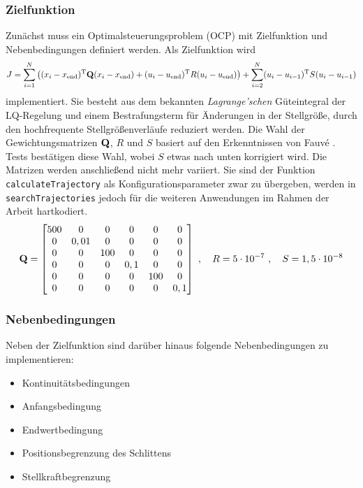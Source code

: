 \subsubsection{Zielfunktion}

Zunächst muss ein Optimalsteuerungsproblem (OCP) mit Zielfunktion und Nebenbedingungen definiert werden. Als Zielfunktion wird 
	\[
	J = \sum_{i=1}^N \left((x_i-x_{\mathrm{end}})^{\mathrm{T}} {\boldsymbol{\mathrm{Q}}} (x_i-x_{\mathrm{end}}) + (u_i-u_{\mathrm{end}})^{\mathrm{T}} R (u_i-u_{\mathrm{end}})\right) + 
	\sum_{i=2}^N (u_i-u_{i-1})^{\mathrm{T}} S (u_i-u_{i-1})
\]
implementiert. Sie besteht aus dem bekannten \emph{Lagrange'schen} Güteintegral der LQ-Regelung und einem Bestrafungsterm für Änderungen in der Stellgröße, durch den hochfrequente Stellgrößenverläufe reduziert werden. Die Wahl der Gewichtungsmatrizen ${\boldsymbol{\mathrm{Q}}}$, $R$ und $S$ basiert auf den Erkenntnissen von Fauvé \cite{fauve}. Tests bestätigen diese Wahl, wobei $S$ etwas nach unten korrigiert wird. Die Matrizen werden anschließend nicht mehr variiert. Sie sind der Funktion \texttt{calculateTrajectory} als Konfigurationsparameter zwar zu übergeben, werden in \texttt{searchTrajectories} jedoch für die weiteren Anwendungen im Rahmen der Arbeit hartkodiert.
\[ 
	{\boldsymbol{\mathrm{Q}}} = 
	\begin{bmatrix}
		500 & 0 & 0 & 0 & 0 & 0 \\
		0 & 0,01 & 0 & 0 & 0 & 0 \\
		0 & 0 & 100 & 0 & 0 & 0 \\
		0 & 0 & 0 & 0,1 & 0 & 0 \\
		0 & 0 & 0 & 0 & 100 & 0 \\
		0 & 0 & 0 & 0 & 0 & 0,1 \\
	\end{bmatrix} \ , \quad
	R = 5 \cdot 10^{-7} \ , \quad
	S = 1,5 \cdot 10^{-8} \\	
\]

\subsubsection{Nebenbedingungen}

Neben der Zielfunktion sind darüber hinaus folgende Nebenbedingungen zu implementieren:
\begin{itemize}
	\item Kontinuitätsbedingungen 
	\item Anfangsbedingung
	\item Endwertbedingung
	\item Positionsbegrenzung des Schlittens
	\item Stellkraftbegrenzung
\end{itemize}

